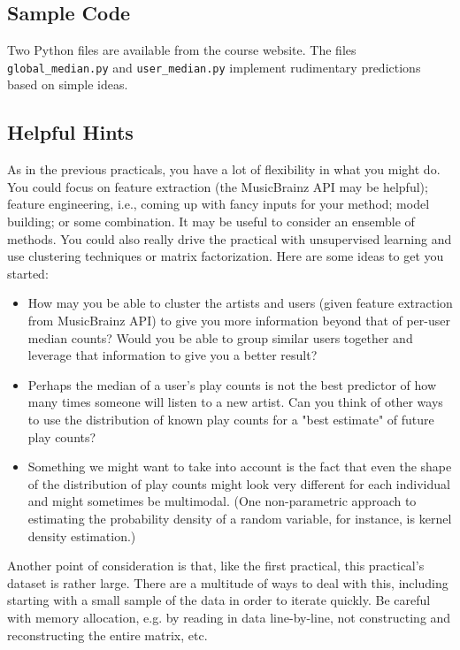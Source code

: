 \documentclass[12pt]{article}
\begin{document}
\subsection*{Sample Code}
Two Python files are available from the course website.  The files \verb|global_median.py| and \verb|user_median.py| implement rudimentary predictions based on simple ideas.

\subsection*{Helpful Hints} As in the previous practicals, you have a lot of flexibility in what you might do.  You could focus on feature extraction (the MusicBrainz API may be helpful); feature engineering, i.e., coming up with fancy inputs for your method; model building; or some combination. It may be useful to consider an ensemble of methods. You could also really drive the practical with unsupervised learning and use clustering techniques or matrix factorization. Here are some ideas to get you started:

\begin{itemize}
\item How may you be able to cluster the artists and users (given feature extraction from MusicBrainz API) to give you more information beyond that of per-user median counts? Would you be able to group similar users together and leverage that information to give you a better result?
\item Perhaps the median of a user's play counts is not the best predictor of how many times someone will listen to a new artist. Can you think of other ways to use the distribution of known play counts for a "best estimate" of future play counts?
\item Something we might want to take into account is the fact that even the shape of the distribution of play counts might look very different for each individual and might sometimes be multimodal. (One non-parametric approach to estimating the probability density of a random variable, for instance, is kernel density estimation.)
\end{itemize}

Another point of consideration is that, like the first practical, this practical's dataset is rather large. There are a multitude of ways to deal with this, including starting with a small sample of the data in order to iterate quickly. Be careful with memory allocation, e.g. by reading in data line-by-line, not constructing and reconstructing the entire matrix, etc.
\end{document}
